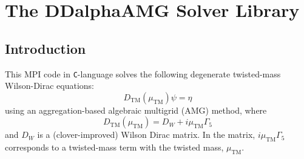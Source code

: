 \documentclass[a4paper,12pt]{scrartcl}
\begin{document}
\section{The DDalphaAMG Solver Library}

\subsection{Introduction}
This MPI code in \texttt{C}-language solves the following degenerate twisted-mass Wilson-Dirac equations:
\begin{equation*}
D_{\mathrm{TM}}(\mu_\mathrm{TM}) \psi = \eta
\end{equation*}
using an aggregation-based algebraic multigrid (AMG) method, where 
\begin{equation*}
D_{\mathrm{TM}}(\mu_\mathrm{TM}) = D_{W}+i\mu_\mathrm{TM}\Gamma_5
\end{equation*}
and $D_W$ is a (clover-improved) Wilson Dirac matrix.  In the matrix, $i\mu_\mathrm{TM}\Gamma_5$ corresponds to a twisted-mass term with the twisted mass, $\mu_\mathrm{TM}$.  

\end{document}
